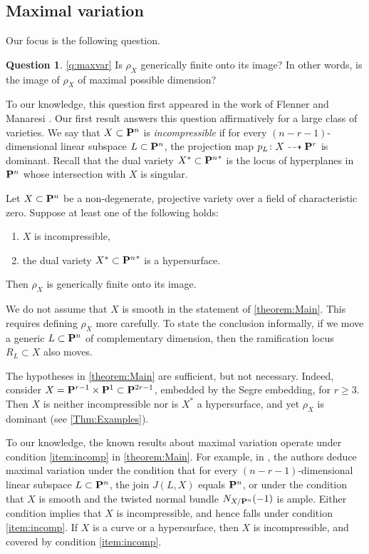 \documentclass[11pt,reqno]{amsart}
\theoremstyle{plain}
\theoremstyle{definition}
\newtheorem{question}[theorem]{Question}
\theoremstyle{remark}
\numberwithin{equation}{section}
\numberwithin{equation}{section}
\begin{document}
\subsection{Maximal variation}
Our focus is the following question.
\begin{question}\autoref{q:maxvar}
  Is $\rho_{X}$ generically finite onto its image? In other words, is the image of $\rho_X$ of maximal possible dimension?
\end{question}

To our knowledge, this question first appeared in the work of Flenner and Manaresi \cite{MANAFlenn:}.
Our first result answers this question affirmatively for a large class of varieties.
We say that $X \subset \P^n$ is \emph{incompressible} if for every $(n-r-1)$-dimensional linear subspace $L \subset \P^n$, the projection map $p_L \from X \dashrightarrow \P^r$ is dominant.
Recall that the dual variety $X^* \subset {\P^n}^*$ is the locus of hyperplanes in $\P^n$ whose intersection with $X$ is singular.
\begin{maintheorem}\label{theorem:Main}
  Let $X \subset \P^n$ be a non-degenerate, projective variety over a field of characteristic zero.
  Suppose at least one of the following holds:
  \begin{enumerate}
  \item\label{item:incomp} $X$ is incompressible, 
  \item\label{item:dual} the dual variety $X^* \subset {\P^n}^*$ is a hypersurface.
  \end{enumerate}
  Then $\rho_{X}$ is generically finite onto its image.
\end{maintheorem} 
We do not assume that $X$ is smooth in the statement of \autoref{theorem:Main}.
This requires defining $\rho_X$ more carefully.
To state the conclusion informally, if we move a generic $L \subset \P^n$ of complementary dimension, then the ramification locus $R_L \subset X$ also moves.

The hypotheses in \autoref{theorem:Main} are sufficient, but not necessary.
Indeed, consider $X = \P^{r-1} \times \P^1 \subset \P^{2r-1}$, embedded by the Segre embedding, for $r \geq 3$.
Then $X$ is neither incompressible nor is $X^*$ a hypersurface, and yet $\rho_X$ is dominant (see \autoref{Thm:Examples}).

To our knowledge, the known results about maximal variation operate under condition \eqref{item:incomp} in \autoref{theorem:Main}.
For example, in \cite{MANAFlenn:}, the authors deduce maximal variation under the condition that for every $(n-r-1)$-dimensional linear subspace $L \subset \P^n$, the join $J(L, X)$ equals $\P^n$, or under the condition that $X$ is smooth and the twisted normal bundle $N_{X/\P^n}(-1)$ is ample.
Either condition implies that $X$ is incompressible, and hence falls under condition \eqref{item:incomp}.
If $X$ is a curve or a hypersurface, then $X$ is incompressible, and covered by condition \eqref{item:incomp}.
\end{document}
